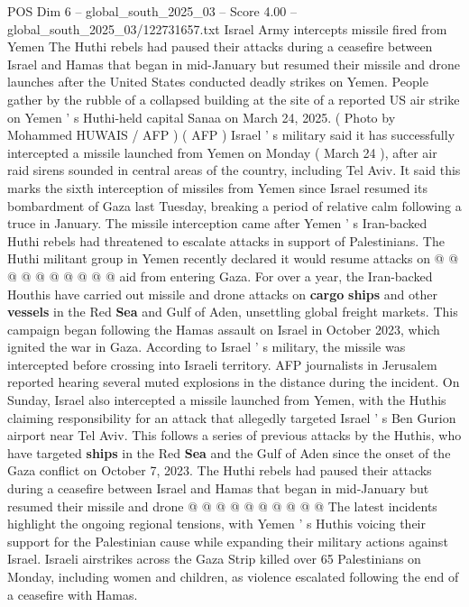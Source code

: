 \begin{textsample}{POS Dim 6 – global\_south\_2025\_03 – Score 4.00 – global\_south\_2025\_03/122731657.txt}  \label{ex:f6_pos_314}
Israel Army intercepts missile fired from Yemen The Huthi rebels had paused their attacks during a ceasefire between Israel and Hamas that began in mid-January but resumed their missile and drone launches after the United States conducted deadly strikes on Yemen.
People gather by the rubble of a collapsed building at the site of a reported US air strike on Yemen ' s Huthi-held capital Sanaa on March 24, 2025. ( Photo by Mohammed HUWAIS / AFP ) ( AFP ) Israel ' s military said it has successfully intercepted a missile launched from Yemen on Monday ( March 24 ), after air raid sirens sounded in central areas of the country, including Tel Aviv.
It said this marks the sixth interception of missiles from Yemen since Israel resumed its bombardment of Gaza last Tuesday, breaking a period of relative calm following a truce in January.
The missile interception came after Yemen ' s Iran-backed Huthi rebels had threatened to escalate attacks in support of Palestinians.
The Huthi militant group in Yemen recently declared it would resume attacks on @ @ @ @ @ @ @ @ @ @ aid from entering Gaza.
For over a year, the Iran-backed Houthis have carried out missile and drone attacks on \textbf{cargo} \textbf{ships} and other \textbf{vessels} in the Red \textbf{Sea} and Gulf of Aden, unsettling global freight markets.
This campaign began following the Hamas assault on Israel in October 2023, which ignited the war in Gaza.
According to Israel ' s military, the missile was intercepted before crossing into Israeli territory.
AFP journalists in Jerusalem reported hearing several muted explosions in the distance during the incident.
On Sunday, Israel also intercepted a missile launched from Yemen, with the Huthis claiming responsibility for an attack that allegedly targeted Israel ' s Ben Gurion airport near Tel Aviv.
This follows a series of previous attacks by the Huthis, who have targeted \textbf{ships} in the Red \textbf{Sea} and the Gulf of Aden since the onset of the Gaza conflict on October 7, 2023.
The Huthi rebels had paused their attacks during a ceasefire between Israel and Hamas that began in mid-January but resumed their missile and drone @ @ @ @ @ @ @ @ @ @ The latest incidents highlight the ongoing regional tensions, with Yemen ' s Huthis voicing their support for the Palestinian cause while expanding their military actions against Israel.
Israeli airstrikes across the Gaza Strip killed over 65 Palestinians on Monday, including women and children, as violence escalated following the end of a ceasefire with Hamas.

\end{textsample}
